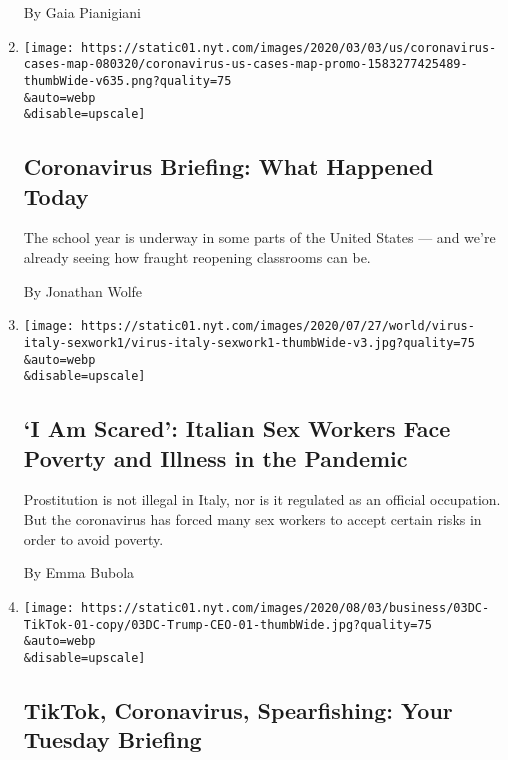 \begin{enumerate}
  By Gaia Pianigiani
\item
  \href{/2020/08/03/us/coronavirus-today.html}{}

  \texttt{[image: https://static01.nyt.com/images/2020/03/03/us/coronavirus-cases-map-080320/coronavirus-us-cases-map-promo-1583277425489-thumbWide-v635.png?quality=75\\\&auto=webp\\\&disable=upscale]}

  \hypertarget{coronavirus-briefing-what-happened-today}{%
  \subsection{Coronavirus Briefing: What Happened
  Today}\label{coronavirus-briefing-what-happened-today}}

  The school year is underway in some parts of the United States --- and
  we're already seeing how fraught reopening classrooms can be.

  By Jonathan Wolfe
\item
  \href{/2020/08/03/world/europe/italy-coronavirus-prostitution-sex-work.html}{}

  \texttt{[image: https://static01.nyt.com/images/2020/07/27/world/virus-italy-sexwork1/virus-italy-sexwork1-thumbWide-v3.jpg?quality=75\\\&auto=webp\\\&disable=upscale]}

  \hypertarget{i-am-scared-italian-sex-workers-face-poverty-and-illness-in-the-pandemic}{%
  \subsection{`I Am Scared': Italian Sex Workers Face Poverty and
  Illness in the
  Pandemic}\label{i-am-scared-italian-sex-workers-face-poverty-and-illness-in-the-pandemic}}

  Prostitution is not illegal in Italy, nor is it regulated as an
  official occupation. But the coronavirus has forced many sex workers
  to accept certain risks in order to avoid poverty.

  By Emma Bubola
\item
  \href{/2020/08/03/briefing/coronavirus-tiktok-afghanistan-australia.html}{}

  \texttt{[image: https://static01.nyt.com/images/2020/08/03/business/03DC-TikTok-01-copy/03DC-Trump-CEO-01-thumbWide.jpg?quality=75\\\&auto=webp\\\&disable=upscale]}

  \hypertarget{tiktok-coronavirus-spearfishing-your-tuesday-briefing}{%
  \subsection{TikTok, Coronavirus, Spearfishing: Your Tuesday
  Briefing}\label{tiktok-coronavirus-spearfishing-your-tuesday-briefing}}


\end{enumerate}
